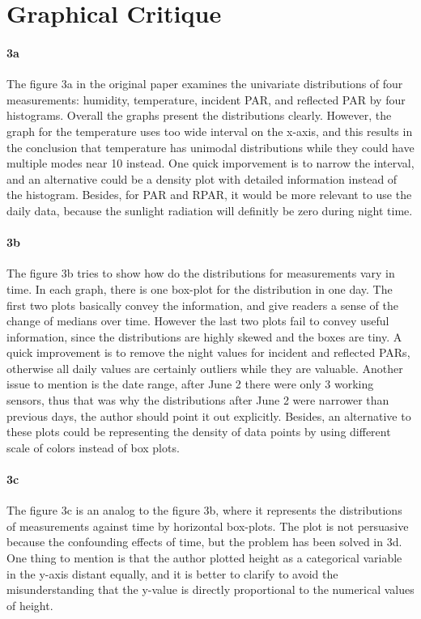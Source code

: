 \documentclass[11pt]{article}
\begin{document}
{\section{Graphical Critique}
\paragraph{3a}
The figure 3a in the original paper examines the univariate distributions of four measurements: humidity, temperature, incident PAR, and reflected PAR by four histograms. Overall the graphs present the distributions clearly. However, the graph for the temperature uses too wide interval on the x-axis, and this results in the conclusion that temperature has unimodal distributions while they could have multiple modes near 10 instead. One quick imporvement is to narrow the interval, and an alternative could be a density plot with detailed information instead of the histogram. Besides, for PAR and RPAR, it would be more relevant to use the daily data, because the sunlight radiation will definitly be zero during night time.
\paragraph{3b}
The figure 3b tries to show how do the distributions for measurements vary in time. In each graph, there is one box-plot for the distribution in one day. The first two plots basically convey the information, and give readers a sense of the change of medians over time. However the last two plots fail to convey useful information, since the distributions are highly skewed and the boxes are tiny. A quick improvement is to remove the night values for incident and reflected PARs, otherwise all daily values are certainly outliers while they are valuable. Another issue to mention is the date range, after June 2 there were only 3 working sensors, thus that was why the distributions after June 2 were narrower than previous days, the author should point it out explicitly. Besides, an alternative to these plots could be representing the density of data points by using different scale of colors instead of box plots. 
\paragraph{3c}
The figure 3c is an analog to the figure 3b, where it represents the distributions of measurements against time by horizontal box-plots. The plot is not persuasive because the confounding effects of time, but the problem has been solved in 3d. One thing to mention is that the author plotted height as a categorical variable in the y-axis distant equally, and it is better to clarify to avoid the misunderstanding that the y-value is directly proportional to the numerical values of height.
}
\end{document}
